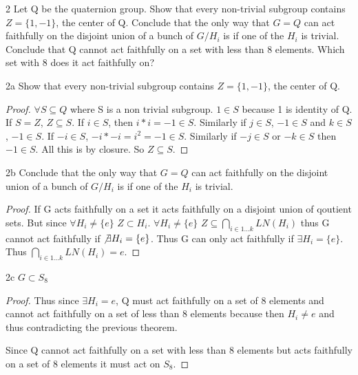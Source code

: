 \documentclass{article}
\begin{document}
\bigskip

\begin{PROB}{2}\label{Problem 2.}
    Let Q be the quaternion group. Show that every non-trivial subgroup contains $Z = \{1,-1\}$, the center of Q. Conclude that the only way that $G = Q$ can act faithfully on the disjoint union of a bunch of $G/H_i$ is if one of the $H_i$ is trivial. Conclude that Q cannot act faithfully on a set with less than 8 elements. Which set with 8 does it act faithfully on?
\end{PROB}
\begin{claim}{2a}
    Show that every non-trivial subgroup contains $Z = \{1,-1\}$, the center of Q.
\end{claim}
\begin{proof}
    $\forall S \subseteq Q$ where S is a non trivial subgroup. $1 \in S$ because 1 is identity of Q. If $S = Z$, $Z \subseteq S$. If $i \in S$, then $i * i = -1 \in S$. Similarly if $j \in S$, $-1 \in S$ and $k \in S$, $-1 \in S$. If $-i \in S$, $-i * -i = i^2 = -1 \in S$. Similarly if $-j \in S$ or $-k \in S$ then $-1 \in S$. All this is by closure. So $Z \subseteq S$. 
\end{proof}
\begin{claim}{2b}
    Conclude that the only way that $G = Q$ can act faithfully on the disjoint union of a bunch of $G/H_i$ is if one of the $H_i$ is trivial.
\end{claim}
\begin{proof}
    If G acts faithfully on a set it acts faithfully on a disjoint union of qoutient sets. But since $\forall H_i \neq \{e\}$ $Z \subset H_i$. $\forall H_i \neq \{e\}$ $Z \subseteq \bigcap_{i \in 1...k}LN(H_i)$ thus G cannot act faithfully if $\not \exists H_i = \{e\}$. Thus G can only act faithfully if $\exists H_i = \{e\}$. Thus $\bigcap_{i \in 1...k}LN(H_i) = e$.
\end{proof}
\begin{claim}{2c}
    $G \subset S_8$
\end{claim}
\begin{proof}
    Thus since $\exists H_i = e$, Q must act faithfully on a set of 8 elements and cannot act faithfully on a set of less than 8 elements because then $H_i \neq e$ and thus contradicting the previous theorem.

    Since Q cannot act faithfully on a set with less than 8 elements but acts faithfully on a set of 8 elements it must act on $S_8$.
\end{proof}
\end{document}
